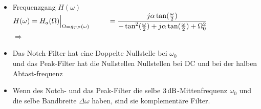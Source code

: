 \begin{minipage}{0.48\textwidth}
\begin{itemize}
		 \item Frequenzgang $H(\omega)$\\[0.2cm]
		 $H(\omega) = H_a(\Omega)\Big|_{\Omega=g_{TP}(\omega)}\\[0.2cm]
		 \hspace*{0.9cm}=\dfrac{j\alpha\tan(\frac{\omega}{2})}{-\tan^2(\frac{\omega}{2})+j\alpha\tan(\frac{\omega}{2})+ \Omega_0^2}$\\[0.25cm]
		 $\Rightarrow\quad\;$
		\end{itemize}
	\end{minipage}
\newpage

	\begin{itemize}
	 \item Das Notch-Filter hat eine Doppelte Nullstelle bei $\omega_0\quad$  \\
	 und das Peak-Filter hat die Nullstellen Nullstellen bei DC und bei der halben Abtast-frequenz$\quad$
	 \item Wenn des Notch- und das Peak-Filter die selbe $3\,\text{dB}$-Mittenfrequenz $\omega_0$ und die selbe Bandbreite $\Delta\omega$ haben, sind sie komplementäre Filter. %
	 $\quad$
	\end{itemize}

